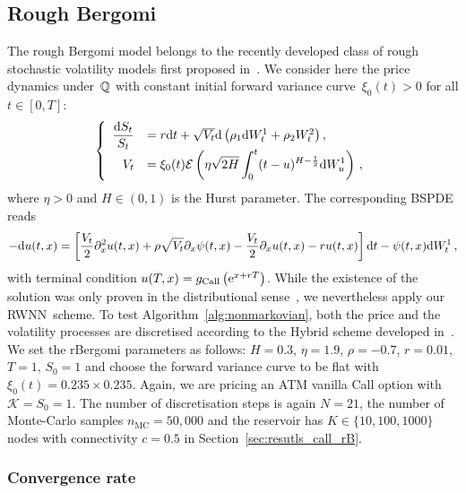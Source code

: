 \subsection{Rough Bergomi}
The rough Bergomi model belongs to the recently developed class of rough stochastic volatility models first proposed in~\cite{Bayer2015PricingVolatility, Gatheral2018VolatilityRough, Guennoun2018AsymptoticModel}. We consider here the price dynamics under~$\mathbb{Q}$ with constant initial forward variance curve~$\xi_0(t)>0$ for all $t\in[0,T]$:
\begin{equation*}
\left\{
\begin{array}{rl}
\displaystyle\frac{\mathrm{d} S_t}{S_t} &= r \mathrm{d} t + \sqrt{V_t} \mathrm{d} \left(\rho_1\mathrm{d} W^1_t + \rho_2 W^2_t\right), \\
V_t &= \displaystyle \xi_0(t)\mathcal{E}\left( \eta\sqrt{2H} \int_0^t (t-u)^{H-\frac{1}{2}} \mathrm{d} W_u^1 \right)\,,
\end{array}
\right.
\end{equation*}
where $\eta>0$ and $H\in(0,1)$ is the Hurst parameter. 
The corresponding BSPDE reads
\begin{equation}\label{eq:roughBergomi}
-\mathrm{d} u(t,x) = \left[\frac{V_{t}}{2} \partial_x^{2} u(t, x)+\rho \sqrt{V_{t}} \partial_x \psi(t,x)-\frac{V_{t}}{2} \partial_x u(t,x)-r u(t,x)\right] \mathrm{d} t-\psi(t,x) \mathrm{d} W^1_{t}\,,
\end{equation}
with terminal condition $u(T, x) = g_{\textup{Call}}\left(\mathrm{e}^{x+r T}\right)$. 
While the existence of the solution was only proven in the distributional sense~\cite{Bayer2022PricingSPDEs}, we nevertheless apply our RWNN~scheme.
To test Algorithm~\ref{alg:nonmarkovian}, both the price and the volatility processes are discretised according to the Hybrid scheme developed in~\cite{Bennedsen2017HybridProcesses, McCrickerd2018TurbochargingModel}. 
We set the rBergomi parameters as follows: $H=0.3$, $\eta=1.9$, $\rho=-0.7$, $r=0.01$, $T=1$, $S_0=1$ and choose the forward variance curve to be flat with $\xi_0(t) = 0.235\times 0.235$. Again, we are pricing an ATM vanilla Call option with $\mathscr K=S_0=1$. The number of discretisation steps is again $N=21$, the number of Monte-Carlo samples $n_{\mathrm{MC}}=50,000$ and the reservoir has $K\in\{10, 100, 1000\}$ nodes with connectivity $c=0.5$ in Section~\ref{sec:resutls_call_rB}. 

\subsubsection{Convergence rate}\label{sec:rB_convergence_rate}

